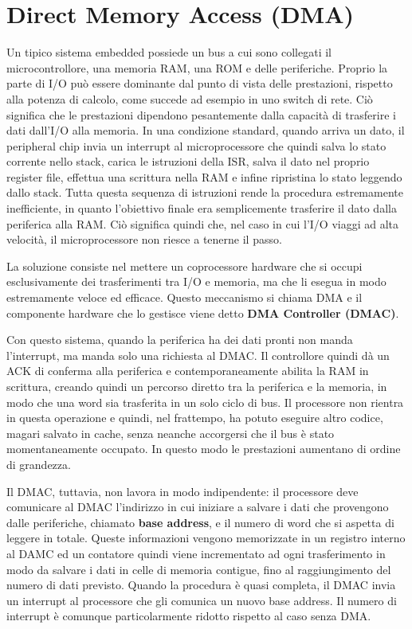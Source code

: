 \documentclass[11pt,4paper]{report}
\begin{document}
\section{Direct Memory Access (DMA)}
Un tipico sistema embedded possiede un bus a cui sono collegati il microcontrollore, una memoria RAM, una ROM e delle periferiche. Proprio la parte di I/O può essere dominante dal punto di vista delle prestazioni, rispetto alla potenza di calcolo, come succede ad esempio in uno switch di rete. Ciò significa che le prestazioni dipendono pesantemente dalla capacità di trasferire i dati dall'I/O alla memoria. In una condizione standard, quando arriva un dato, il peripheral chip invia un interrupt al microprocessore che quindi salva lo stato corrente nello stack, carica le istruzioni della ISR, salva il dato nel proprio register file, effettua una scrittura nella RAM e infine ripristina lo stato leggendo dallo stack. Tutta questa sequenza di istruzioni rende la procedura estremamente inefficiente, in quanto l'obiettivo finale era semplicemente trasferire il dato dalla periferica alla RAM. Ciò significa quindi che, nel caso in cui l'I/O viaggi ad alta velocità, il microprocessore non riesce a tenerne il passo.


La soluzione consiste nel mettere un coprocessore hardware che si occupi esclusivamente dei trasferimenti tra I/O e memoria, ma che li esegua in modo estremamente veloce ed efficace. Questo meccanismo si chiama DMA e il componente hardware che lo gestisce viene detto \textbf{DMA Controller (DMAC)}. 

Con questo sistema, quando la periferica ha dei dati pronti non manda l'interrupt, ma manda solo una richiesta al DMAC. Il controllore quindi dà un ACK di conferma alla periferica e contemporaneamente abilita la RAM in scrittura, creando quindi un percorso diretto tra la periferica e la memoria, in modo che una word sia trasferita in un solo ciclo di bus. Il processore non rientra in questa operazione e quindi, nel frattempo, ha potuto eseguire altro codice, magari salvato in cache, senza neanche accorgersi che il bus è stato momentaneamente occupato. In questo modo le prestazioni aumentano di ordine di grandezza.

Il DMAC, tuttavia, non lavora in modo indipendente: il processore deve comunicare al DMAC l'indirizzo in cui iniziare a salvare i dati che provengono dalle periferiche, chiamato \textbf{base address}, e il numero di word che si aspetta di leggere in totale. Queste informazioni vengono memorizzate in un registro interno al DAMC ed un contatore quindi viene incrementato ad ogni trasferimento in modo da salvare i dati in celle di memoria contigue, fino al raggiungimento del numero di dati previsto. Quando la procedura è quasi completa, il DMAC invia un interrupt al processore che gli comunica un nuovo base address. Il numero di interrupt è comunque particolarmente ridotto rispetto al caso senza DMA.
\end{document}
